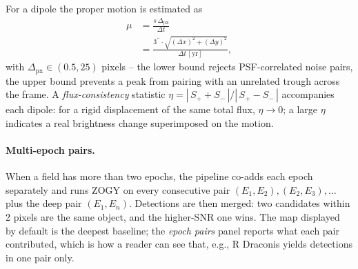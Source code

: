 \documentclass[11pt,a4paper]{article}
\newcommand{\arcsec}{\ensuremath{{}^{\prime\prime}}}
\begin{document}
For a dipole the proper motion is estimated as
\begin{equation}
\begin{aligned}
  \mu &= \frac{s\,\Delta_{\mathrm{px}}}{\Delta t} \\
      &= \frac{3\arcsec \cdot \sqrt{(\Delta x)^2+(\Delta y)^2}}{\Delta t\,[\mathrm{yr}]},
\end{aligned}
\label{eq:mu}
\end{equation}
with $\Delta_{\mathrm{px}} \in (0.5, 25)$ pixels -- the lower bound rejects PSF-correlated noise pairs,
the upper bound prevents a peak from pairing with an unrelated trough across the frame. A
\emph{flux-consistency} statistic $\eta = |\,S_+ + S_-\,| / |\,S_+ - S_-\,|$ accompanies each dipole: for a
rigid displacement of the same total flux, $\eta \to 0$; a large $\eta$ indicates a real brightness
change superimposed on the motion.

\paragraph{Multi-epoch pairs.} When a field has more than two epochs, the pipeline co-adds each epoch
separately and runs ZOGY on every consecutive pair $(E_1,E_2), (E_2,E_3), \dots$ plus the deep pair
$(E_1,E_n)$. Detections are then merged: two candidates within 2 pixels are the same object, and the
higher-SNR one wins. The map displayed by default is the deepest baseline; the \emph{epoch pairs}
panel reports what each pair contributed, which is how a reader can see that, e.g., R Draconis yields
detections in one pair only.
\end{document}
